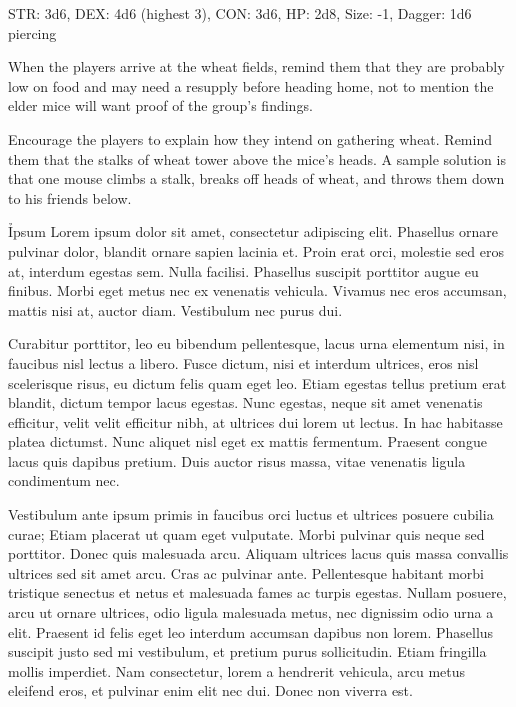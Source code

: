 \documentclass{novel}
\begin{document}
STR: 3d6, DEX: 4d6 (highest 3), CON: 3d6, HP: 2d8, Size: -1, Dagger: 1d6 piercing


When the players arrive at the wheat fields, remind them that they are probably low on food and may need a resupply before heading home, not to mention the elder mice will want proof of the group's findings.

Encourage the players to explain how they intend on gathering wheat. Remind them that the stalks of wheat tower above the mice's heads. A sample solution is that one mouse climbs a stalk, breaks off heads of wheat, and throws them down to his friends below.





\h{Ipsum}
Lorem ipsum dolor sit amet, consectetur adipiscing elit. Phasellus ornare pulvinar dolor, blandit ornare sapien lacinia et. Proin erat orci, molestie sed eros at, interdum egestas sem. Nulla facilisi. Phasellus suscipit porttitor augue eu finibus. Morbi eget metus nec ex venenatis vehicula. Vivamus nec eros accumsan, mattis nisi at, auctor diam. Vestibulum nec purus dui.

Curabitur porttitor, leo eu bibendum pellentesque, lacus urna elementum nisi, in faucibus nisl lectus a libero. Fusce dictum, nisi et interdum ultrices, eros nisl scelerisque risus, eu dictum felis quam eget leo. Etiam egestas tellus pretium erat blandit, dictum tempor lacus egestas. Nunc egestas, neque sit amet venenatis efficitur, velit velit efficitur nibh, at ultrices dui lorem ut lectus. In hac habitasse platea dictumst. Nunc aliquet nisl eget ex mattis fermentum. Praesent congue lacus quis dapibus pretium. Duis auctor risus massa, vitae venenatis ligula condimentum nec.

Vestibulum ante ipsum primis in faucibus orci luctus et ultrices posuere cubilia curae; Etiam placerat ut quam eget vulputate. Morbi pulvinar quis neque sed porttitor. Donec quis malesuada arcu. Aliquam ultrices lacus quis massa convallis ultrices sed sit amet arcu. Cras ac pulvinar ante. Pellentesque habitant morbi tristique senectus et netus et malesuada fames ac turpis egestas. Nullam posuere, arcu ut ornare ultrices, odio ligula malesuada metus, nec dignissim odio urna a elit. Praesent id felis eget leo interdum accumsan dapibus non lorem. Phasellus suscipit justo sed mi vestibulum, et pretium purus sollicitudin. Etiam fringilla mollis imperdiet. Nam consectetur, lorem a hendrerit vehicula, arcu metus eleifend eros, et pulvinar enim elit nec dui. Donec non viverra est.
\end{document}
